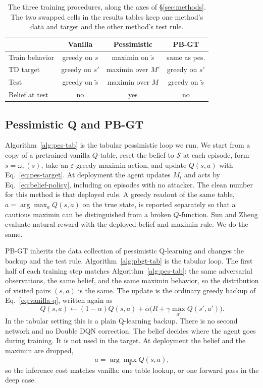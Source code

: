 \documentclass[10pt,twocolumn]{article}
\begin{document}
\begin{table}[t]
\centering
\small
\caption{The three training procedures, along the axes of \S\ref{sec:methods}. The two swapped cells in the results tables keep one method's data and target and the other method's test rule.}
\label{tab:methods}
\setlength{\tabcolsep}{3pt}
\begin{tabular}{@{}lccc@{}}
\toprule
 & Vanilla & Pessimistic & PB-GT \\
\midrule
Train behavior & greedy on $s$ & maximin on $\tilde s$ & same as pes. \\
TD target & greedy on $s'$ & maximin over $M'$ & greedy on $s'$ \\
Test & greedy on $\tilde s$ & maximin over $M$ & greedy on $\tilde s$ \\
Belief at test & no & yes & no \\
\bottomrule
\end{tabular}
\end{table}

\subsection{Pessimistic Q and PB-GT}
\label{sec:pbgt}

Algorithm~\ref{alg:pes-tab} is the tabular pessimistic loop we run.
We start from a copy of a pretrained vanilla $Q$-table, reset the belief to $\mathcal{S}$ at each episode, form $\tilde s=\omega_\pi(s)$, take an $\varepsilon$-greedy maximin action, and update $Q(s,a)$ with Eq.~\eqref{eq:pes-target}.
At deployment the agent updates $M_t$ and acts by Eq.~\eqref{eq:belief-policy}, including on episodes with no attacker.
The clean number for this method is that deployed rule.
A greedy readout of the same table, $a=\arg\max_a Q(s,a)$ on the true state, is reported separately so that a cautious maximin can be distinguished from a broken $Q$-function.
Sun and Zheng evaluate natural reward with the deployed belief and maximin rule.
We do the same.

PB-GT inherits the data collection of pessimistic Q-learning and changes the backup and the test rule.
Algorithm~\ref{alg:pbgt-tab} is the tabular loop.
The first half of each training step matches Algorithm~\ref{alg:pes-tab}: the same adversarial observations, the same belief, and the same maximin behavior, so the distribution of visited pairs $(s,a)$ is the same.
The update is the ordinary greedy backup of Eq.~\eqref{eq:vanilla-q}, written again as
\begin{equation}
Q(s,a)\leftarrow (1-\alpha)Q(s,a)+\alpha\bigl(R+\gamma\max_{a'}Q(s',a')\bigr).
\label{eq:pbgt-tab}
\end{equation}
In the tabular setting this is a plain Q-learning backup.
There is no second network and no Double DQN correction.
The belief decides where the agent goes during training.
It is not used in the target.
At deployment the belief and the maximin are dropped,
\begin{equation}
a=\arg\max_{a} Q(\tilde s,a),
\label{eq:pbgt-test}
\end{equation}
so the inference cost matches vanilla: one table lookup, or one forward pass in the deep case.
\end{document}
